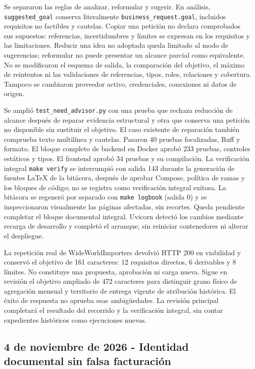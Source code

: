 \documentclass[11pt,letterpaper]{article}
\newcommand{\file}[1]{\texttt{#1}}
\begin{document}
Se separaron las reglas de analizar, reformular y sugerir. En análisis,
\file{suggested\_goal} conserva literalmente \file{business\_request.goal},
incluidos requisitos no factibles y cautelas. Copiar una petición no declara
comprobados sus supuestos: referencias, incertidumbres y límites se expresan
en los requisitos y las limitaciones. Reducir una idea no adoptada queda
limitado al modo de sugerencias; reformular no puede presentar un alcance
parcial como equivalente. No se modificaron el esquema de salida, la
comparación del objetivo, el máximo de reintentos ni las validaciones de
referencias, tipos, roles, relaciones y cobertura. Tampoco se cambiaron
proveedor activo, credenciales, conexiones ni datos de origen.

Se amplió \file{test\_need\_advisor.py} con una prueba que rechaza reducción de
alcance después de reparar evidencia estructural y otra que conserva una
petición no disponible sin sustituir el objetivo. El caso existente de
reparación también comprueba texto multilínea y cautelas. Pasaron 40 pruebas
focalizadas, Ruff y formato. El bloque completo de backend en Docker aprobó
233 pruebas, controles estáticos y tipos. El frontend aprobó 34 pruebas y su
compilación. La verificación integral \file{make verify} se interrumpió con
salida 143 durante la generación de fuentes LaTeX de la bitácora, después de
aprobar Compose, política de ramas y los bloques de código; no se registra
como verificación integral exitosa. La bitácora se regeneró por separado con
\file{make logbook} (salida 0) y se inspeccionaron visualmente las páginas
afectadas, sin recortes. Queda pendiente completar el bloque documental
integral. Uvicorn
detectó los cambios mediante recarga de desarrollo y completó el arranque,
sin reiniciar contenedores ni alterar el despliegue.

La repetición real de WideWorldImporters devolvió HTTP 200 en viabilidad y
conservó el objetivo de 161 caracteres: 12 requisitos directos, 6 derivables y
8 límites. No constituye una propuesta, aprobación ni carga nueva. Sigue en
revisión el objetivo ampliado de 472 caracteres para distinguir grano físico
de agregación mensual y territorio de entrega vigente de atribución histórica.
El éxito de respuesta no aprueba esas ambigüedades. La revisión principal
completará el resultado del recorrido y la verificación integral, sin contar
expedientes históricos como ejecuciones nuevas.

\subsection{4 de noviembre de 2026 - Identidad documental sin falsa facturación}
\end{document}
